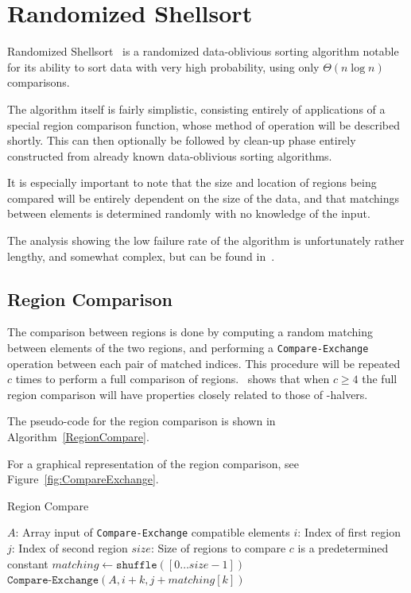 \section{Randomized Shellsort}

Randomized Shellsort~ is a randomized data-oblivious sorting algorithm notable for its ability to sort data with very high probability, using only $\Theta(n \log n)$ comparisons.

The algorithm itself is fairly simplistic, consisting entirely of applications of a special region comparison function, whose method of operation will be described shortly. This can then optionally be followed by clean-up phase entirely constructed from already known data-oblivious sorting algorithms.

It is especially important to note that the size and location of regions being compared will be entirely dependent on the size of the data, and that matchings between elements is determined randomly with no knowledge of the input.

The analysis showing the low failure rate of the algorithm is unfortunately rather lengthy, and somewhat complex, but can be found in~.

\subsection{Region Comparison}
\label{sec:RegionCompare}

The comparison between regions is done by computing a random matching between elements of the two regions, and performing a \texttt{Compare-Exchange} operation between each pair of matched indices.
This procedure will be repeated $c$ times to perform a full comparison of regions.~ shows that when $c \geq 4$ the full region comparison will have properties closely related to those of \textepsilon -halvers.

The pseudo-code for the region comparison is shown in Algorithm~\ref{RegionCompare}.

For a graphical representation of the region comparison, see Figure~\ref{fig:CompareExchange}.


\begin{algorithm}
\caption{Region Compare}\label{RegionCompare}
\begin{algorithmic}[1]
	\Statex $A$: Array input of \texttt{Compare-Exchange} compatible elements
	\Statex $i$: Index of first region
	\Statex $j$: Index of second region
	\Statex $size$: Size of regions to compare
	\Comment $c$ is a predetermined constant
	\State $matching \gets \mathtt{shuffle}([0 \dots size-1])$
		\State $\mathtt{Compare\mbox{-}Exchange}(A, i + k, j + matching[k])$
	\EndFor
\EndFor
\EndProcedure
\end{algorithmic}
\end{algorithm}

